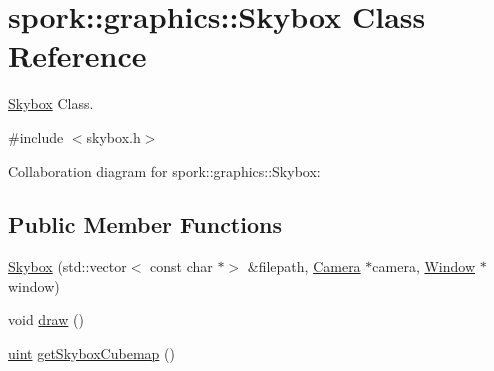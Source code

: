 \hypertarget{classspork_1_1graphics_1_1_skybox}{}\section{spork\+:\+:graphics\+:\+:Skybox Class Reference}
\label{classspork_1_1graphics_1_1_skybox}


\hyperlink{classspork_1_1graphics_1_1_skybox}{Skybox} Class.  




{\ttfamily \#include $<$skybox.\+h$>$}



Collaboration diagram for spork\+:\+:graphics\+:\+:Skybox\+:
\subsection*{Public Member Functions}
\begin{DoxyCompactItemize}
\item 
\hyperlink{classspork_1_1graphics_1_1_skybox_ad86841f1d938a5babf5085bc665da3f3}{Skybox} (std\+::vector$<$ const char $\ast$$>$ \&filepath, \hyperlink{classspork_1_1graphics_1_1_camera}{Camera} $\ast$camera, \hyperlink{classspork_1_1graphics_1_1_window}{Window} $\ast$window)
\item 
void \hyperlink{classspork_1_1graphics_1_1_skybox_ab9f043ba99ee8325ba201997f7868194}{draw} ()
\item 
\hyperlink{defines_8h_a91ad9478d81a7aaf2593e8d9c3d06a14}{uint} \hyperlink{classspork_1_1graphics_1_1_skybox_af88b8c35f618c700a2aeb3db8b708154}{get\+Skybox\+Cubemap} ()
\end{DoxyCompactItemize}
